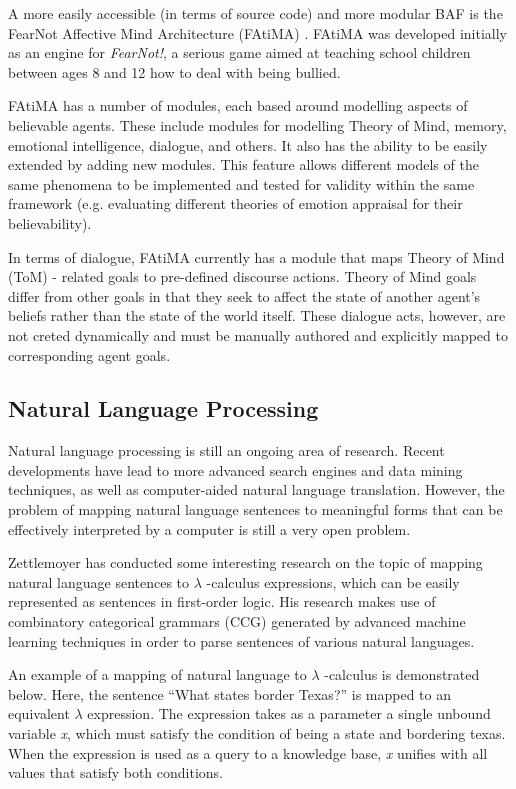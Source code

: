 \documentclass{article}
\begin{document}
A more easily accessible (in terms of source code) and more modular
BAF is the FearNot Affective Mind Architecture (FAtiMA)
\cite{Mascarenhas}.  FAtiMA was developed initially as an engine for
\emph{FearNot!}\cite{Ecircus}, a serious game aimed at
teaching school children between ages 8 and 12 how to deal with being
bullied.

FAtiMA has a number of modules, each based around modelling aspects of
believable agents.  These include modules for modelling Theory of
Mind\cite{Marsella}, memory, emotional intelligence, dialogue, and
others.  It also has the ability to be easily extended by adding new
modules.  This feature allows different models of the same phenomena
to be implemented and tested for validity within the same framework
(e.g. evaluating different theories of emotion appraisal for their
believability).

In terms of dialogue, FAtiMA currently has a module that maps Theory
of Mind (ToM) - related goals to pre-defined discourse actions.  Theory of
Mind goals differ from other goals in that they seek to affect the
state of another agent's beliefs rather than the state of the world
itself.  These dialogue acts, however, are not creted dynamically and
must be manually authored and explicitly mapped to corresponding agent
goals.


\subsection{Natural Language Processing}

Natural language processing is still an ongoing area of research.  Recent
developments have lead to more advanced search engines and data mining 
techniques, as well as computer-aided natural language translation.  However,
the problem of mapping natural language sentences to meaningful forms that can
be effectively interpreted by a computer is still a very open problem.

Zettlemoyer \cite{Zettlemoyer2004} has conducted some interesting research
on the topic of mapping natural language sentences to $\lambda$ -calculus
expressions, which can be easily represented as sentences in
first-order logic.  His research makes use of combinatory categorical
grammars (CCG) \cite{Steedman2003} generated by advanced machine
learning techniques in order to parse sentences of various natural
languages.

An example of a mapping of natural language to $\lambda$ -calculus is
demonstrated below.  Here, the sentence ``What states border Texas?''
is mapped to an equivalent $\lambda$  expression.  The expression takes as
a parameter a single unbound variable \emph{x}, which must satisfy the
condition of being a state and bordering texas.  When the expression
is used as a query to a knowledge base, \emph{x} unifies with all
values that satisfy both conditions.
\end{document}
